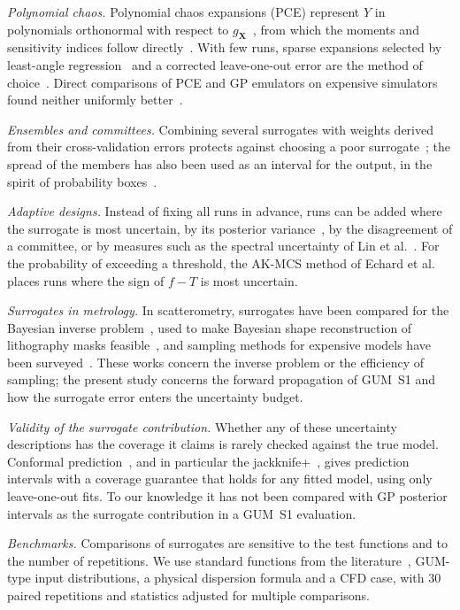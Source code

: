 \emph{Polynomial chaos.} Polynomial chaos expansions (PCE) represent $Y$ in
polynomials orthonormal with respect to $g_{\mathbf X}$~\cite{xiu2002},
from which the moments and sensitivity indices follow
directly~\cite{sudret2008}. With few runs, sparse expansions selected by
least-angle regression~\cite{efron2004} and a corrected leave-one-out
error are the method of choice~\cite{blatman2011}. Direct comparisons of PCE
and GP emulators on expensive simulators found neither uniformly
better~\cite{owen2017}.

\emph{Ensembles and committees.} Combining several surrogates with weights
derived from their cross-validation errors protects against choosing a poor
surrogate~\cite{goel2007,viana2009}; the spread of the members has also
been used as an interval for the output, in the spirit of probability
boxes~\cite{ferson1996}.

\emph{Adaptive designs.} Instead of fixing all runs in advance, runs can be
added where the surrogate is most uncertain, by its posterior
variance~\cite{gramacy2009}, by the disagreement of a committee, or by
measures such as the spectral uncertainty of Lin et al.~\cite{lin2024}. For
the probability of exceeding a threshold, the AK-MCS method of Echard et
al.~\cite{echard2011} places runs where the sign of $f-T$ is most
uncertain.

\emph{Surrogates in metrology.} In scatterometry, surrogates have been
compared for the Bayesian inverse problem~\cite{heidenreich2015}, used to
make Bayesian shape reconstruction of lithography masks
feasible~\cite{farchmin2020}, and sampling methods for expensive models
have been surveyed~\cite{heidenreich2017}. These works concern the
inverse problem or the efficiency of sampling; the present study concerns
the forward propagation of GUM~S1 and how the surrogate error enters the
uncertainty budget.

\emph{Validity of the surrogate contribution.} Whether any of these
uncertainty descriptions has the coverage it claims is rarely checked
against the true model. Conformal prediction~\cite{angelopoulos2023}, and
in particular the jackknife+~\cite{barber2021}, gives prediction intervals
with a coverage guarantee that holds for any fitted model, using only
leave-one-out fits. To our knowledge it has not been compared with GP
posterior intervals as the surrogate contribution in a GUM~S1 evaluation.

\emph{Benchmarks.} Comparisons of surrogates are sensitive to the test
functions and to the number of repetitions. We use standard functions from
the literature~\cite{vlse,wicaksono2023}, GUM-type input distributions, a
physical dispersion formula and a CFD case, with 30 paired repetitions and
statistics adjusted for multiple comparisons.

